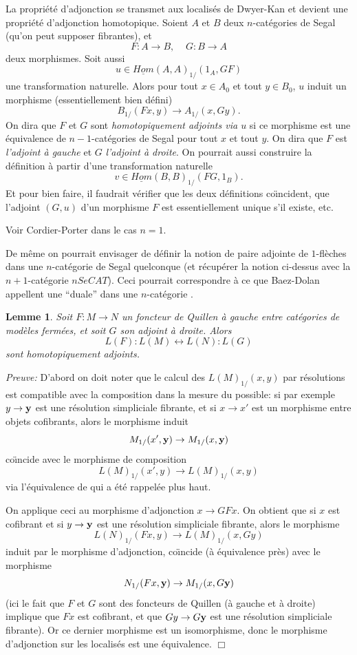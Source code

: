 \documentclass[12pt]{article}
\newcommand{\eop}{\hfill $\Box$\vspace{.1in}}
\newtheorem{lemme}[lemma]{Lemme}
\begin{document}
La propri\'et\'e d'adjonction se transmet aux localis\'es de Dwyer-Kan
et devient une propri\'et\'e d'adjonction homotopique.  Soient $A$ et $B$ deux
$n$-cat\'egories de Segal (qu'on peut supposer fibrantes), et
$$
F: A\rightarrow B,\;\;\;\; G: B\rightarrow A
$$
deux morphismes. Soit aussi
$$
u\in \underline{Hom}(A,A)_{1/}(1_A, GF)
$$
une transformation naturelle. Alors
pour tout $x\in A_0$ et tout $y\in B_0$, $u$ induit un morphisme
(essentiellement
bien d\'efini)
$$
B_{1/}(Fx,y)\rightarrow A_{1/}(x,Gy).
$$
On dira que $F$ et $G$ sont {\em homotopiquement adjoints via $u$} si
ce morphisme est une \'equivalence de $n-1$-cat\'egories de Segal pour tout
$x$ et tout $y$. On dira que $F$ est {\em l'adjoint \`a gauche} et $G$ {\em
l'adjoint \`a
droite}. On pourrait aussi construire la d\'efinition \`a partir
d'une transformation
naturelle
$$
v\in \underline{Hom}(B,B)_{1/}(FG,1_B).
$$
Et pour bien faire, il faudrait v\'erifier
que les deux d\'efinitions co\"{\i}ncident, que l'adjoint
$(G,u)$ d'un morphisme $F$ est essentiellement unique s'il existe, etc.

Voir Cordier-Porter \cite{CordierPorter} dans le cas $n=1$.

De m\^eme on pourrait envisager de d\'efinir la notion de paire adjointe de
$1$-fl\`eches dans une $n$-cat\'egorie de Segal quelconque (et r\'ecup\'erer la
notion ci-dessus avec la $n+1$-cat\'egorie $nSeCAT$). Ceci pourrait correspondre
\`a ce
que Baez-Dolan appellent  une ``duale'' dans une $n$-cat\'egorie
\cite{BaezDolan}.

\begin{lemme}
\label{adjointh}
Soit $F:M\rightarrow N$ un foncteur de Quillen \`a gauche entre cat\'egories de
mod\`eles ferm\'ees, et soit $G$ son adjoint \`a droite.
Alors
$$
L(F): L(M)\leftrightarrow L(N): L(G)
$$
sont homotopiquement adjoints.
\end{lemme}
{\em Preuve:}
D'abord on doit noter que le calcul des $L(M)_{1/}(x,y)$ par r\'esolutions est
compatible avec la composition dans la mesure du possible: si par exemple
$y\rightarrow {\bf y}$ est une r\'esolution simpliciale fibrante, et si
$x\rightarrow x'$ est un morphisme entre objets cofibrants, alors
le morphisme induit
$$
M_{1/}(x',{\bf y})\rightarrow M_{1/}(x,{\bf y})
$$
co\"{\i}ncide avec le morphisme de composition
$$
L(M)_{1/}(x',y)\rightarrow L(M)_{1/}(x,y)
$$
via l'\'equivalence de \cite{DwyerKan2} qui a \'et\'e rappel\'ee plus haut.

On applique ceci au morphisme d'adjonction $x\rightarrow GFx$.
On obtient que si $x$ est cofibrant et si $y\rightarrow {\bf y}$ est une
r\'esolution simpliciale fibrante, alors le morphisme
$$
L(N)_{1/}(Fx,y)\rightarrow L(M)_{1/}(x,Gy)
$$
induit par le morphisme d'adjonction, co\"{\i}ncide (\`a \'equivalence pr\`es)
avec le morphisme
$$
N_{1/}(Fx, {\bf y})\rightarrow M_{1/}(x,G{\bf y})
$$
(ici le fait que $F$ et $G$ sont des foncteurs de Quillen (\`a gauche et \`a
droite) implique que $Fx$ est cofibrant, et que $Gy\rightarrow G{\bf y}$ est une
r\'esolution simpliciale fibrante). Or ce dernier morphisme est un isomorphisme,
donc le morphisme d'adjonction sur les localis\'es est une \'equivalence.
\eop
\end{document}
